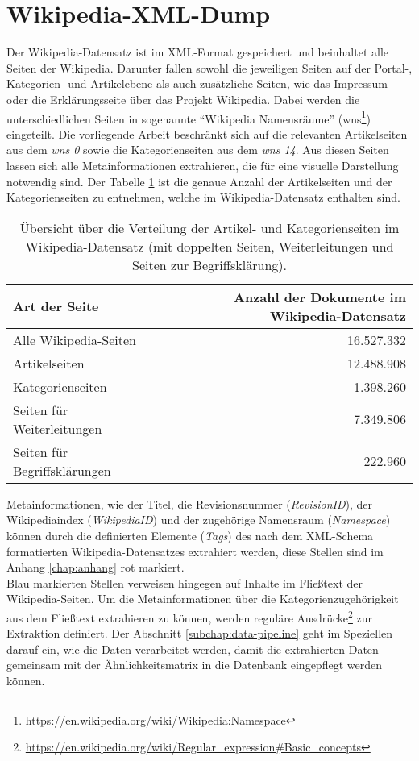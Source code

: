 \section{Wikipedia-XML-Dump} \label{subchap:wikidump}
Der Wikipedia-Datensatz ist im XML-Format gespeichert und beinhaltet alle Seiten der Wikipedia. 
Darunter fallen sowohl die jeweiligen Seiten auf der Portal-, Kategorien- und Artikelebene als auch zusätzliche Seiten, wie das Impressum oder die Erklärungsseite über das Projekt Wikipedia.
Dabei werden die unterschiedlichen Seiten in sogenannte "`Wikipedia Namensräume"' (wns\footnote{\url{https://en.wikipedia.org/wiki/Wikipedia:Namespace}}) eingeteilt.
Die vorliegende Arbeit beschränkt sich auf die relevanten Artikelseiten aus dem \emph{wns 0} sowie die Kategorienseiten aus dem \emph{wns 14}.
Aus diesen Seiten lassen sich alle Metainformationen extrahieren, die für eine visuelle Darstellung notwendig sind.
Der Tabelle \ref{tab:xml-overview} ist die genaue Anzahl der Artikelseiten und der Kategorienseiten zu entnehmen, welche im Wikipedia-Datensatz enthalten sind.

\begin{table}
\centering
\begin{tabular}{l r}
  \hline
  Art der Seite & Anzahl der Dokumente im Wikipedia-Datensatz \\
  \hline
  Alle Wikipedia-Seiten & 16.527.332 \\
  Artikelseiten & 12.488.908 \\
  Kategorienseiten & 1.398.260 \\
  Seiten für Weiterleitungen & 7.349.806\\
  Seiten für Begriffsklärungen & 222.960\\
  \hline
\end{tabular}
\caption{Übersicht über die Verteilung der Artikel- und Kategorienseiten im Wikipedia-Datensatz (mit doppelten Seiten, Weiterleitungen und Seiten zur Begriffsklärung).}
\label{tab:xml-overview}
\end{table}

Metainformationen, wie der Titel, die Revisionsnummer (\emph{RevisionID}), der Wikipediaindex (\emph{WikipediaID}) und der zugehörige Namensraum (\emph{Namespace}) können durch die definierten Elemente (\emph{Tags}) des nach dem XML-Schema formatierten Wikipedia-Datensatzes extrahiert werden, diese Stellen sind im Anhang \ref{chap:anhang} rot markiert.\\
Blau markierten Stellen verweisen hingegen auf Inhalte im Fließtext der Wikipedia-Seiten.
Um die Metainformationen über die Kategorienzugehörigkeit aus dem Fließtext extrahieren zu können, werden reguläre Ausdrücke\footnote{\url{https://en.wikipedia.org/wiki/Regular\_expression\#Basic\_concepts}} zur Extraktion definiert.
Der Abschnitt \ref{subchap:data-pipeline} geht im Speziellen darauf ein, wie die Daten verarbeitet werden, damit die extrahierten Daten gemeinsam mit der Ähnlichkeitsmatrix in die Datenbank eingepflegt werden können.

